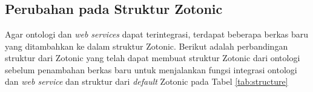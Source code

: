 \chapter{\babLima}

\section{Perubahan pada Struktur Zotonic}

Agar ontologi dan \textit{web services} dapat terintegrasi, terdapat beberapa berkas baru yang ditambahkan ke dalam struktur Zotonic. Berikut adalah perbandingan struktur dari Zotonic yang telah dapat membuat struktur Zotonic dari ontologi sebelum penambahan berkas baru untuk menjalankan fungsi integrasi ontologi dan \textit{web service} dan struktur dari \textit{default} Zotonic pada Tabel \ref{tab:structure}\\
	
